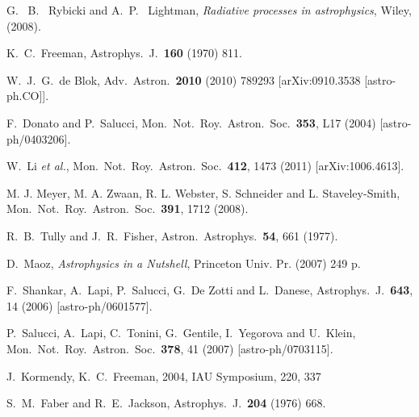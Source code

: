 \documentclass[12pt]{article}
\begin{document}
{{\begin{thebibliography}{999}
 G. ~B. ~Rybicki and A.~P. ~Lightman,
 {\it Radiative processes in astrophysics},
 Wiley, (2008).
 
  K.~C.~Freeman,
  Astrophys.\ J.\  {\bf 160} (1970) 811.

  W.~J.~G.~de Blok,
  Adv.\ Astron.\  {\bf 2010} (2010) 789293
  [arXiv:0910.3538 [astro-ph.CO]].
  
 F.~Donato and P.~Salucci,
 Mon.\ Not.\ Roy.\ Astron.\ Soc.\  {\bf 353}, L17 (2004)
[astro-ph/0403206].
 
W.~Li {\it et al.}, 
Mon.\ Not.\ Roy.\ Astron.\ Soc.\  {\bf 412}, 1473 (2011)
[arXiv:1006.4613].
  
 M. J. Meyer, M. A. Zwaan, R. L. Webster, S. Schneider and L.
Staveley-Smith,
 Mon.\ Not.\ Roy.\ Astron.\ Soc.\  {\bf 391}, 1712 (2008).

R.~B.~Tully and J.~R.~Fisher,
Astron.\ Astrophys.\  {\bf 54}, 661 (1977).

D.~Maoz,
{\it Astrophysics in a Nutshell},
Princeton Univ. Pr. (2007) 249 p.

 F.~Shankar, A.~Lapi, P.~Salucci, G.~De Zotti and L.~Danese,
 Astrophys.\ J.\  {\bf 643}, 14 (2006)
 [astro-ph/0601577].

P.~Salucci, A.~Lapi, C.~Tonini, G.~Gentile, I.~Yegorova and U.~Klein,
Mon.\ Not.\ Roy.\ Astron.\ Soc.\  {\bf 378}, 41 (2007)
[astro-ph/0703115].

 J.~Kormendy, K.~C.~Freeman, 2004, IAU Symposium, 220, 337

  S.~M.~Faber and R.~E.~Jackson,
  Astrophys.\ J.\  {\bf 204} (1976) 668.


\end{thebibliography}}}
\end{document}
